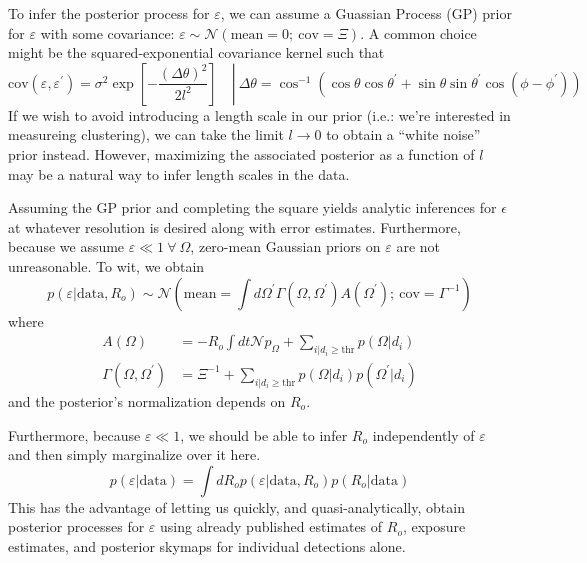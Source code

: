 \documentclass{article}
\begin{document}
To infer the posterior process for $\varepsilon$, we can assume a Guassian Process (GP) prior for $\varepsilon$ with some covariance: $\varepsilon \sim \mathcal{N}\left(\mathrm{mean}=0;\ \mathrm{cov}=\Xi\right)$.
A common choice might be the squared-exponential covariance kernel such that
\begin{equation}
    \left. \text{cov}(\varepsilon, \varepsilon^\prime) = \sigma^2 \exp \left[ -\frac{\left(\Delta \theta\right)^2}{2l^2}\right] \quad  \right| \ \Delta \theta = \cos^{-1}\left(\cos\theta\cos\theta^\prime + \sin\theta\sin\theta^\prime\cos(\phi-\phi^\prime)\right)
\end{equation}
If we wish to avoid introducing a length scale in our prior (i.e.: we're interested in measureing clustering), we can take the limit $l \rightarrow 0$ to obtain a ``white noise'' prior instead.
However, maximizing the associated posterior as a function of $l$ may be a natural way to infer length scales in the data.

Assuming the GP prior and completing the square yields analytic inferences for $\epsilon$ at whatever resolution is desired along with error estimates.
Furthermore, because we assume $\varepsilon \ll 1 \ \forall \ \Omega$, zero-mean Gaussian priors on $\varepsilon$ are not unreasonable.
To wit, we obtain
\begin{equation}
    p(\varepsilon|\mathrm{data}, R_o) \sim \mathcal{N}\left( \mathrm{mean}=\int d\Omega^\prime \Gamma(\Omega, \Omega^\prime) A(\Omega^\prime);\ \mathrm{cov}=\Gamma^{-1}\right)
\end{equation}
where
\begin{align}
    A(\Omega) & = -R_o\int dt\mathcal{N}p_\Omega + \sum\limits_{i|d_i\geq\mathrm{thr}} p(\Omega|d_i) \\
    \Gamma(\Omega, \Omega^\prime) & = \Xi^{-1} + \sum\limits_{i|d_i\geq\mathrm{thr}} p(\Omega|d_i)p(\Omega^\prime|d_i)
\end{align}
and the posterior's normalization depends on $R_o$.

Furthermore, because $\varepsilon\ll1$, we should be able to infer $R_o$ independently of $\varepsilon$ and then simply marginalize over it here.
\begin{equation}
    p(\varepsilon|\mathrm{data}) = \int dR_o p(\varepsilon|\mathrm{data},R_o)p(R_o|\mathrm{data})
\end{equation}
This has the advantage of letting us quickly, and quasi-analytically, obtain posterior processes for $\varepsilon$ using already published estimates of $R_o$, exposure estimates, and posterior skymaps for individual detections alone.

\end{document}
